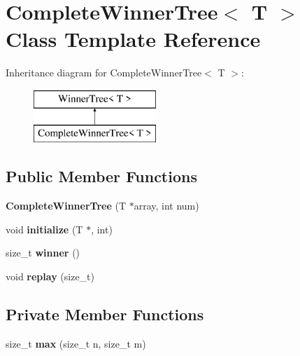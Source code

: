 \hypertarget{classCompleteWinnerTree}{}\section{Complete\+Winner\+Tree$<$ T $>$ Class Template Reference}
\label{classCompleteWinnerTree}
Inheritance diagram for Complete\+Winner\+Tree$<$ T $>$\+:\begin{figure}[H]
\begin{center}
\leavevmode
\includegraphics[height=2.000000cm]{classCompleteWinnerTree}
\end{center}
\end{figure}
\subsection*{Public Member Functions}
\begin{DoxyCompactItemize}
\item 
\mbox{\label{classCompleteWinnerTree_aa2634870d578aacdeeb9a7ae5ce9d078}} 
{\bfseries Complete\+Winner\+Tree} (T $\ast$array, int num)
\item 
\mbox{\label{classCompleteWinnerTree_a9c7cf644a3051d4ed3e02fb5da53dcf1}} 
void {\bfseries initialize} (T $\ast$, int)
\item 
\mbox{\label{classCompleteWinnerTree_abc4419384c68a0b08b8fa3fbfb1d6238}} 
size\+\_\+t {\bfseries winner} ()
\item 
\mbox{\label{classCompleteWinnerTree_a0e9092b85b87a0083746bea27368c587}} 
void {\bfseries replay} (size\+\_\+t)
\end{DoxyCompactItemize}
\subsection*{Private Member Functions}
\begin{DoxyCompactItemize}
\item 
\mbox{\label{classCompleteWinnerTree_a284633037345aff8d7f87400b2ebc0eb}} 
size\+\_\+t {\bfseries max} (size\+\_\+t n, size\+\_\+t m)
\end{DoxyCompactItemize}
